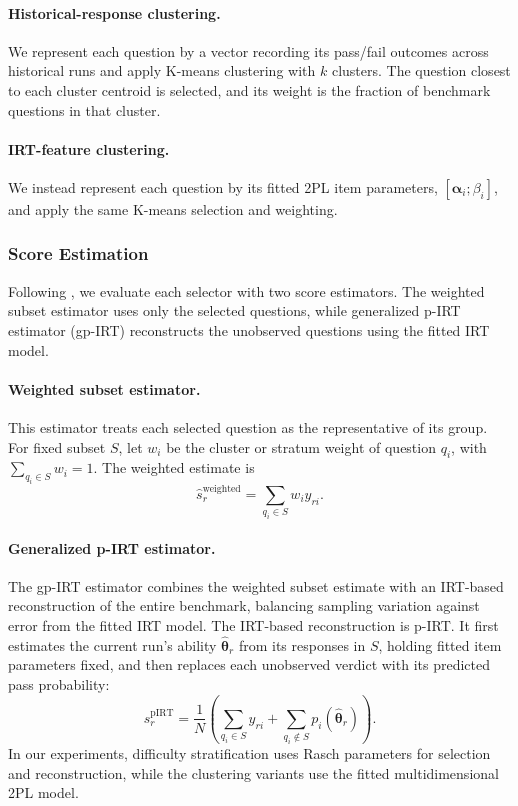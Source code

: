 \paragraph{Historical-response clustering.}
We represent each question by a vector recording its pass/fail outcomes across
historical runs and apply K-means clustering with $k$ clusters. The question
closest to each cluster centroid is selected, and its weight is the fraction of
benchmark questions in that cluster.

\paragraph{IRT-feature clustering.}
We instead represent each question by its fitted 2PL item parameters,
$[\boldsymbol{\alpha}_i;\beta_i]$, and apply the same K-means selection and weighting.

\subsubsection{Score Estimation}
Following \citet{maiapolo2024tinybenchmarks}, we evaluate each selector with two
score estimators. The weighted subset estimator uses only the selected
questions, while generalized p-IRT estimator (gp-IRT) reconstructs the unobserved questions
using the fitted IRT model.


\paragraph{Weighted subset estimator.}
This estimator treats each selected question as the representative of its
group.
For fixed subset $S$, let $w_i$ be the cluster or stratum weight of question
$q_i$, with $\sum_{q_i\in S}w_i=1$. The weighted estimate is
\begin{equation}
  \hat{s}_r^{\mathrm{weighted}}
  = \sum_{q_i\in S}w_i y_{ri}.
\end{equation}

\paragraph{Generalized p-IRT estimator.}

The gp-IRT estimator combines the weighted subset estimate with an IRT-based
reconstruction of the entire benchmark, balancing sampling variation against
error from the fitted IRT model.
The IRT-based reconstruction is p-IRT. It first estimates the current run’s ability
$\hat{\boldsymbol{\theta}}_r$ from its responses in $S$, holding fitted item
parameters fixed, and then replaces each unobserved verdict with its predicted pass
probability:
\begin{equation}\label{equation:pirt}
  \hat{s}_r^{\mathrm{pIRT}}
  = \frac{1}{N}\left(
      \sum_{q_i\in S}y_{ri}
      + \sum_{q_i\notin S}p_i(\hat{\boldsymbol{\theta}}_r)
    \right).
\end{equation}
In our experiments, difficulty stratification uses Rasch parameters for selection and
reconstruction, while the clustering variants use the fitted multidimensional 2PL
model.


